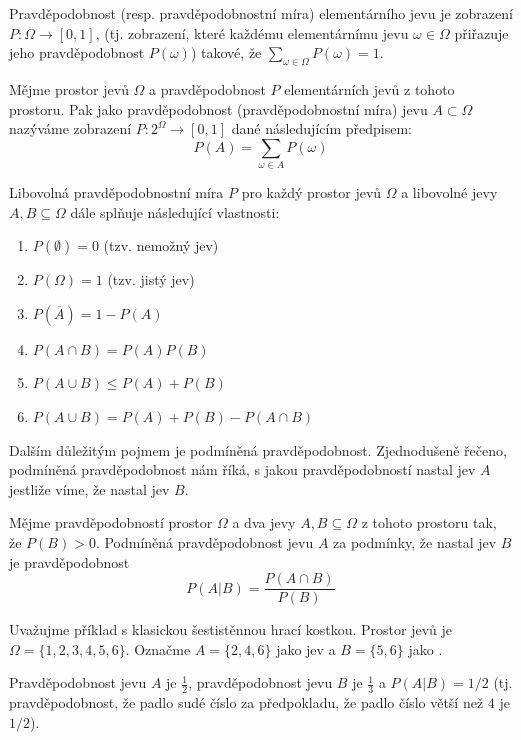 \begin{definition}
 Pravděpodobnost (resp. pravděpodobnostní míra) elementárního jevu je zobrazení $P: \Omega \rightarrow [0,1]$, (tj. zobrazení, které každému elementárnímu jevu $\omega \in \Omega$ přiřazuje jeho pravděpodobnost $P(\omega)$) takové, že $\sum_{\omega \in \Omega} P(\omega) = 1$.
\end{definition}

\begin{definition}
 Mějme prostor jevů $\Omega$ a pravděpodobnost $P$ elementárních jevů z tohoto prostoru. Pak jako pravděpodobnost (pravděpodobnostní míra) jevu $A \subset \Omega$ nazýváme zobrazení $P: 2^\Omega \rightarrow [0,1]$ dané následujícím předpisem:
  $$
    P(A) = \sum_{\omega \in A} P(\omega)
  $$
\end{definition}

Libovolná pravděpodobnostní míra $P$ pro každý prostor jevů $\Omega$ a libovolné jevy $A, B \subseteq \Omega$ dále splňuje následující vlastnosti:
\begin{enumerate}
 \item $P(\emptyset) = 0$ (tzv. nemožný jev)
 \item $P(\Omega) = 1$ (tzv. jistý jev)
 \item $P(\overline{A}) = 1 - P(A)$
 \item $P(A \cap B) = P(A) P(B)$
 \item $P(A \cup B) \leq P(A) + P(B)$
 \item $P(A \cup B) = P(A) + P(B) - P(A \cap B)$
\end{enumerate}

Dalším důležitým pojmem je podmíněná pravděpodobnost. Zjednodušeně řečeno, podmíněná pravděpodobnost nám říká, s jakou pravděpodobností nastal jev $A$ jestliže víme, že nastal jev $B$.

\begin{definition}
 Mějme pravděpodobností prostor $\Omega$ a dva jevy $A, B \subseteq \Omega$ z tohoto prostoru tak, že $P(B) > 0$. Podmíněná pravděpodobnost jevu $A$ za podmínky, že nastal jev $B$ je pravděpodobnost 
 $$
  P(A | B) = \frac{P(A \cap B)}{P(B)}
 $$
\end{definition}

\begin{example}[Pravděpodobnost]
 Uvažujme příklad s klasickou šestistěnnou hrací kostkou. Prostor jevů je $\Omega = \{ 1,2,3,4,5,6 \}$. Označme $A = \{2, 4, 6\}$ jako jev  a $B = \{ 5, 6 \}$ jako .
 
 Pravděpodobnost jevu $A$ je $\frac{1}{2}$, pravděpodobnost jevu $B$ je $\frac{1}{3}$ a $P(A | B) = 1 / 2$ (tj. pravděpodobnost, že padlo sudé číslo za předpokladu, že padlo číslo větší než $4$ je $1/2$).
\end{example}


